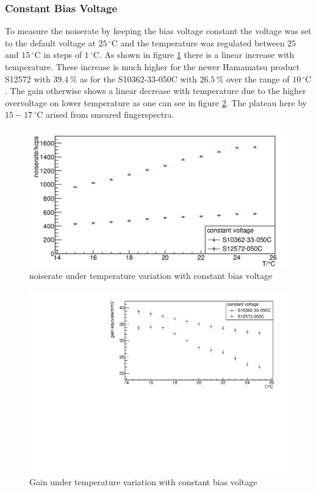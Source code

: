 \subsubsection{Constant Bias Voltage}
To measure the noiserate by keeping the bias voltage constant the voltage was set to the default voltage at $25\,\mathrm{^{\circ}C}$ and the temperature was regulated between $25$ and $15\,\mathrm{^{\circ}C}$ in steps of $1\,\mathrm{^{\circ}C}$. As shown in figure \ref{constVolt_rate} there is a linear increase with temperature. These increase is much higher for the newer Hamamatsu product S12572 with $39.4\,\mathrm{\%}$ as for the S10362-33-050C with $26.5\,\mathrm{\%}$ over the range of $10\,\mathrm{^{\circ}C}$.
The gain otherwise shows a linear decrease with temperature due to the higher overvoltage on lower temperature as one can see in figure \ref{constVolt_gain}. The plateau here by $15 - 17\,\mathrm{^{\circ}C}$ arised from smeared fingerspectra.
\begin{figure}[h]
	\centering
	\includegraphics[width = 0.75 \textwidth]{Figures/radermacher/ConstVolt_Rate_linear.pdf}
	\caption{noiserate under temperature variation with constant bias voltage}
	\label{constVolt_rate}
\end{figure}
\begin{figure}[h]
	\centering
	\includegraphics[width = 0.75 \textwidth]{Figures/radermacher/constVolt_Gain.pdf}
	\caption{Gain under temperature variation with constant bias voltage}
	\label{constVolt_gain}
\end{figure}
